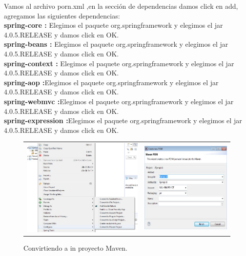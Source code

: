 Vamos al archivo porn.xml ,en la secci\'on de dependencias damos click en add, agregamos las siguientes dependencias:\\
\textbf{spring-core :} Elegimos el paquete org.springframework y elegimos el jar 4.0.5.RELEASE y damos click en OK.\\
\textbf{spring-beans :} Elegimos el paquete org.springframework y elegimos el jar 4.0.5.RELEASE y damos click en OK.\\
\textbf{spring-context :} Elegimos el paquete org.springframework y elegimos el jar 4.0.5.RELEASE y damos click en OK.\\
\textbf{spring-aop :}Elegimos el paquete org.springframework y elegimos el jar 4.0.5.RELEASE y damos click en OK.\\
\textbf{spring-webmvc :}Elegimos el paquete org.springframework y elegimos el jar 4.0.5.RELEASE y damos click en OK.\\
\textbf{spring-expression :}Elegimos el paquete org.springframework y elegimos el jar 4.0.5.RELEASE y damos click en OK.
\begin{figure}[H]
	\centering
	\begin{tabular}{cc}
		\includegraphics[scale=0.8]{images/c13_10.jpg}
	 &\includegraphics[scale=0.65]{images/c13_11.jpg}
	\end{tabular}
	\caption{Convirtiendo a in proyecto Maven.}
\end{figure}
